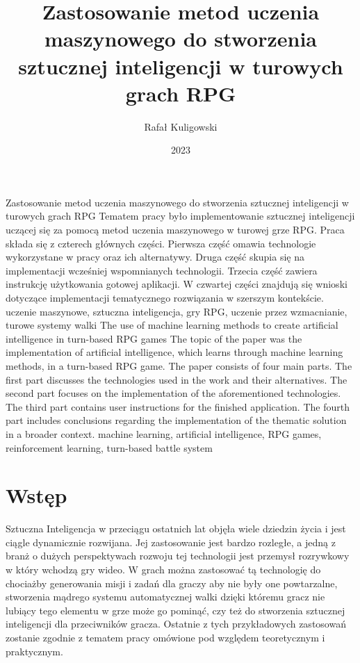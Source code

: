 \documentclass{SGGW-thesis}
\title{Zastosowanie metod uczenia maszynowego do stworzenia sztucznej inteligencji w turowych grach RPG}
\author{Rafał Kuligowski}
\date{2023}
\begin{document}
\maketitle
\statementpage
\abstractpage
{Zastosowanie metod uczenia maszynowego do stworzenia sztucznej inteligencji w turowych grach RPG}
{Tematem pracy było implementowanie sztucznej inteligencji uczącej się za pomocą metod uczenia maszynowego w turowej grze RPG. Praca składa się z czterech głównych części.
Pierwsza część omawia technologie wykorzystane w pracy oraz ich alternatywy. Druga część skupia się na implementacji wcześniej wspomnianych technologii.
Trzecia część zawiera instrukcję użytkowania gotowej aplikacji. W czwartej części znajdują się wnioski dotyczące implementacji tematycznego rozwiązania w szerszym kontekście.}
{uczenie maszynowe, sztuczna inteligencja, gry RPG, uczenie przez wzmacnianie, turowe systemy walki}
{The use of machine learning methods to create artificial intelligence in turn-based RPG games}
{The topic of the paper was the implementation of artificial intelligence, which learns through machine learning methods, in a turn-based RPG game. 
The paper consists of four main parts. The first part discusses the technologies used in the work and their alternatives. The second part focuses on 
the implementation of the aforementioned technologies. The third part contains user instructions for the finished application. The fourth part includes 
conclusions regarding the implementation of the thematic solution in a broader context.}
{machine learning, artificial intelligence, RPG games, reinforcement learning, turn-based battle system}


{
  \doublespacing
  \tableofcontents
}

\startchapterfromoddpage %

\chapter{Wstęp}
Sztuczna Inteligencja w przeciągu ostatnich lat objęła wiele dziedzin życia i jest ciągle dynamicznie rozwijana. Jej zastosowanie jest bardzo 
rozległe, a jedną z branż o dużych perspektywach rozwoju tej technologii jest przemysł rozrywkowy w który wchodzą gry wideo. W grach można zastosować 
tą technologię do chociażby generowania misji i zadań dla graczy aby nie były one powtarzalne, stworzenia mądrego systemu automatycznej walki dzięki
któremu gracz nie lubiący tego elementu w grze może go pominąć, czy też do stworzenia sztucznej inteligencji dla przeciwników gracza. Ostatnie z tych 
przykładowych zastosowań zostanie zgodnie z tematem pracy omówione pod względem teoretycznym i praktycznym.
\end{document}
